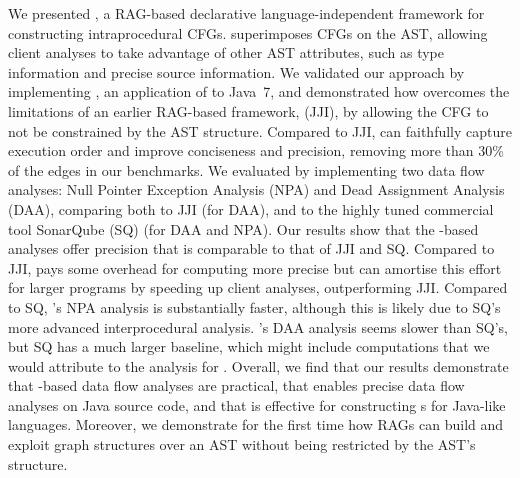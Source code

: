 We presented {\intracfg}, a RAG-based declarative language-independent framework for constructing intraprocedural CFGs.
{\intracfg} superimposes CFGs on the AST, allowing client analyses to take advantage of other AST attributes, such as type information and precise source information.
We validated our approach by implementing {\intraj}, an application of {\intracfg} to Java~7,
and demonstrated how {\intracfg} overcomes the limitations of an earlier RAG-based framework, {\jastaddjintraflow} (JJI), by allowing the CFG to not be constrained by the AST structure.
Compared to JJI, {\intraj} can faithfully capture execution order and improve {\CFG} conciseness and precision, removing  more than 30\% of the {\CFG} edges in our benchmarks.
We evaluated \intraj{} by implementing two data flow analyses: Null Pointer Exception Analysis (NPA) and Dead Assignment Analysis (DAA), comparing both to JJI (for DAA), and to the highly tuned commercial tool SonarQube (SQ) (for DAA and NPA).
Our results show that the {\intraj}-based analyses offer precision that is comparable to that of JJI and SQ.
Compared to JJI, {\intraj} pays some overhead for computing more precise {\CFG} but can amortise this effort for larger programs by speeding up client analyses, outperforming JJI.
Compared to SQ, {\intraj}'s NPA analysis is substantially faster, although this is likely due to SQ's more advanced interprocedural analysis.
{\intraj}'s DAA analysis seems slower than SQ's, but SQ has a much larger baseline, which might include computations that we would attribute to the analysis for {\intraj}.
Overall, we find that our results demonstrate that {\intraj}-based data flow analyses are practical, that {\intraj} enables precise data flow analyses on Java source code,
and that {\intracfg} is effective for constructing {\CFG}s for Java-like languages.
Moreover, we demonstrate for the first time how RAGs can build and exploit graph structures over an AST without being restricted by the AST's structure.
